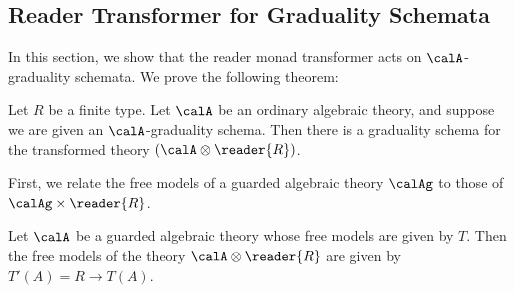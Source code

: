 \subsection{Reader Transformer for Graduality Schemata}

In this section, we show that the reader monad transformer acts on
$\calA$-graduality schemata. We prove the following theorem:
\begin{theorem}
  Let $R$ be a finite type. Let $\calA$ be an ordinary algebraic theory, and
  suppose we are given an $\calA$-graduality schema. Then there is a graduality
  schema for the transformed theory $(\calA \otimes \reader{R})$.
\end{theorem}

First, we relate the free models of a guarded algebraic theory $\calAg$ to those
of $\calAg \times \reader{R}$.
\begin{lemma}\label{lem:reader-monad-transformer-free-models} Let $\calA$ be a
    guarded algebraic theory whose free models are given by $T$. Then the free
    models of the theory $\calA \otimes \reader{R}$ are given by $T'(A) = R \to
    T(A)$.
\end{lemma}
